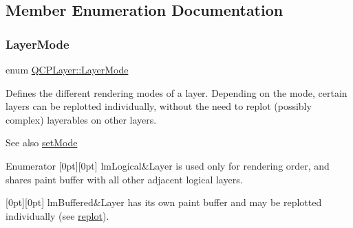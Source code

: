 \subsection{Member Enumeration Documentation}
\mbox{\label{class_q_c_p_layer_a67dcfc1590be2a1f2227c5a39bb59c7c}} 
\subsubsection{\texorpdfstring{Layer\+Mode}{LayerMode}}
{\footnotesize\ttfamily enum \mbox{\hyperlink{class_q_c_p_layer_a67dcfc1590be2a1f2227c5a39bb59c7c}{Q\+C\+P\+Layer\+::\+Layer\+Mode}}}

Defines the different rendering modes of a layer. Depending on the mode, certain layers can be replotted individually, without the need to replot (possibly complex) layerables on other layers.

\begin{DoxySeeAlso}{See also}
\mbox{\hyperlink{class_q_c_p_layer_a938d57b04f4e4c23cedf1711f983919b}{set\+Mode}} 
\end{DoxySeeAlso}
\begin{DoxyEnumFields}{Enumerator}
[0pt][0pt]{}\mbox{\label{class_q_c_p_layer_a67dcfc1590be2a1f2227c5a39bb59c7ca02eb5e9a4cb7f1baf1e2b6b99e3b87ce}} 
lm\+Logical&Layer is used only for rendering order, and shares paint buffer with all other adjacent logical layers. \\
\hline

[0pt][0pt]{}\mbox{\label{class_q_c_p_layer_a67dcfc1590be2a1f2227c5a39bb59c7cab581b9fab3007c4c65f057f4185d7538}} 
lm\+Buffered&Layer has its own paint buffer and may be replotted individually (see \mbox{\hyperlink{class_q_c_p_layer_adefd53b6db02f470151c416f42e37180}{replot}}). \\
\hline

\end{DoxyEnumFields}


